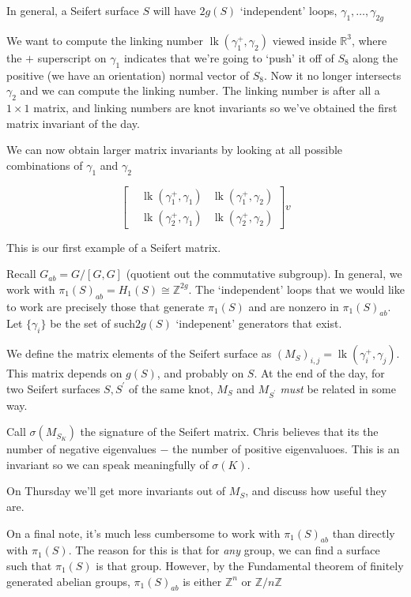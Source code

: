 \documentclass[11pt]{article}
\newcommand{\Z}{\mathbb{Z}}
\newcommand{\R}{\mathbb{R}}
\newcommand{\set}[1]{\{ #1 \}}
\DeclareMathOperator{\lk}{lk}
\theoremstyle{plain}
\theoremstyle{definition}
\begin{document}
In general, a Seifert surface $S$ will have $2g(S)$ `independent' loops, $\gamma_1, \ldots, \gamma_{2g}$

We want to compute the linking number $\lk(\gamma_1^{+}, \gamma_2)$ viewed inside $\R^3$, where the $+$ superscript on $\gamma_1$ indicates that we're going to `push' it off of $S_8$ along the positive
(we have an orientation) normal vector of $S_8$. Now it no longer intersects $\gamma_2$ and we can compute the linking number. The linking number is after all a $1 \times 1$ matrix, and linking numbers are knot invariants so we've
obtained the first matrix invariant of the day.

We can now obtain larger matrix invariants by looking at all possible combinations of $\gamma_1$ and $\gamma_2$


\begin{equation}
\left[
\begin{matrix}
  &\lk(\gamma_1^+, \gamma_1) &\lk(\gamma_1^+, \gamma_2) \\
  &\lk(\gamma_2^+, \gamma_1) &\lk(\gamma_2^+, \gamma_2)
\end{matrix}
\right]v
\end{equation}

This is our first example of a Seifert matrix.

Recall $G_{ab} = G / [G, G]$ (quotient out the commutative subgroup). In general, we work with $\pi_1{(S)}_{ab} = H_1(S) \cong \Z^{2g}$. The `independent' loops that we would like to work are precisely those that generate $\pi_1(S)$ and
are nonzero in $\pi_1{(S)}_{ab}$. Let $\set{\gamma_i}$ be the set of such$2g(S)$ `indepenent' generators that exist.

We define the matrix elements of the Seifert surface as ${(M_S)}_{i,j} = \lk(\gamma_i^+, \gamma_j)$. This matrix depends on $g(S)$, and probably on $S$. At the end of the day, for two Seifert surfaces $S, S^\prime$ of the same knot,
$M_S$ and $M_{S^\prime}$ \emph{must} be related in some way.

Call $\sigma(M_{S_K})$ the signature of the Seifert matrix. Chris believes that its the number of negative eigenvalues $-$ the number of positive eigenvaluoes. This is an invariant so we can speak meaningfully of $\sigma(K)$.

On Thursday we'll get more invariants out of $M_S$, and discuss how useful they are.

On a final note, it's much less cumbersome to work with $\pi_1{(S)}_{ab}$ than directly with $\pi_1(S)$. The reason for this is that for \emph{any} group, we can find a surface such that $\pi_1(S)$ is that group. However,
by the Fundamental theorem of finitely generated abelian groups, $\pi_1(S)_{ab}$ is either $\Z^n$ or $\Z / n\Z$
\end{document}
